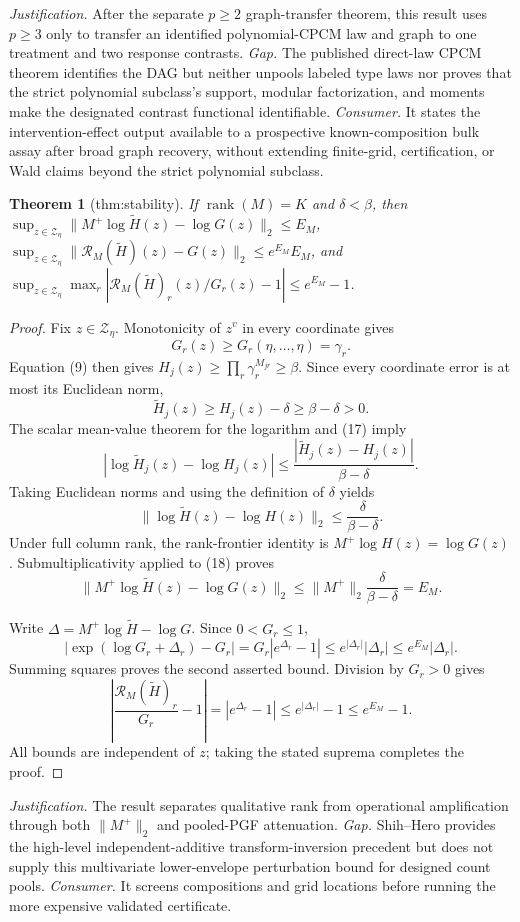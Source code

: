 \documentclass{article}
\newtheorem{theorem}{Theorem}
\begin{document}
\par\smallskip\noindent \textit{Justification.} After the separate \(p\geq2\) graph-transfer theorem, this result uses \(p\geq3\) only to transfer an identified polynomial-CPCM law and graph to one treatment and two response contrasts. \textit{Gap.} The published direct-law CPCM theorem identifies the DAG but neither unpools labeled type laws nor proves that the strict polynomial subclass's support, modular factorization, and moments make the designated contrast functional identifiable. \textit{Consumer.} It states the intervention-effect output available to a prospective known-composition bulk assay after broad graph recovery, without extending finite-grid, certification, or Wald claims beyond the strict polynomial subclass.

\begin{theorem}[thm:stability]\label{thm:stability}
If \(\operatorname{rank}(M)=K\) and \(\delta<\beta\), then \(\sup_{z\in\mathcal Z_\eta}\lVert M^{+}\log\widetilde H(z)-\log G(z)\rVert_2\leq E_M\), \(\sup_{z\in\mathcal Z_\eta}\lVert\mathscr R_M(\widetilde H)(z)-G(z)\rVert_2\leq e^{E_M}E_M\), and \(\sup_{z\in\mathcal Z_\eta}\max_r|\mathscr R_M(\widetilde H)_r(z)/G_r(z)-1|\leq e^{E_M}-1\).
\end{theorem}
\begin{proof}
Fix \(z\in\mathcal Z_\eta\).  Monotonicity of \(z^v\) in every coordinate gives
\[
G_r(z)\geq G_r(\eta,\ldots,\eta)=\gamma_r.
\]
Equation (9) then gives \(H_j(z)\geq\prod_r\gamma_r^{M_{jr}}\geq\beta\).  Since every coordinate error is at most its Euclidean norm,
\[
\widetilde H_j(z)\geq H_j(z)-\delta\geq\beta-\delta>0. \tag{17}
\]
The scalar mean-value theorem for the logarithm and (17) imply
\[
|\log\widetilde H_j(z)-\log H_j(z)|
\leq\frac{|\widetilde H_j(z)-H_j(z)|}{\beta-\delta}.
\]
Taking Euclidean norms and using the definition of \(\delta\) yields
\[
\|\log\widetilde H(z)-\log H(z)\|_2
\leq\frac{\delta}{\beta-\delta}. \tag{18}
\]
Under full column rank, the rank-frontier identity is
\(M^+\log H(z)=\log G(z)\).  Submultiplicativity applied to (18) proves
\[
\|M^+\log\widetilde H(z)-\log G(z)\|_2
\leq \|M^+\|_2\frac{\delta}{\beta-\delta}=E_M. \tag{19}
\]

Write \(\Delta=M^+\log\widetilde H-\log G\).  Since \(0<G_r\leq1\),
\[
|\exp(\log G_r+\Delta_r)-G_r|
=G_r|e^{\Delta_r}-1|
\leq e^{|\Delta_r|}|\Delta_r|
\leq e^{E_M}|\Delta_r|.
\]
Summing squares proves the second asserted bound.  Division by \(G_r>0\) gives
\[
\left|\frac{\mathscr R_M(\widetilde H)_r}{G_r}-1\right|
=|e^{\Delta_r}-1|
\leq e^{|\Delta_r|}-1\leq e^{E_M}-1.
\]
All bounds are independent of \(z\); taking the stated suprema completes the proof.
\end{proof}
\par\smallskip\noindent \textit{Justification.} The result separates qualitative rank from operational amplification through both \(\lVert M^{+}\rVert_2\) and pooled-PGF attenuation. \textit{Gap.} Shih--Hero provides the high-level independent-additive transform-inversion precedent but does not supply this multivariate lower-envelope perturbation bound for designed count pools. \textit{Consumer.} It screens compositions and grid locations before running the more expensive validated certificate.
\end{document}
